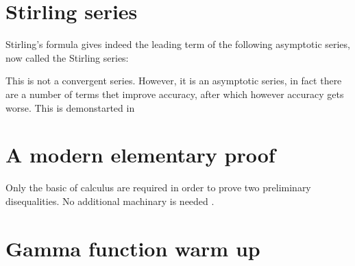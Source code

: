 \documentclass[onecolumn,a4paper,11pt]{article}
\begin{document}
\section{Stirling series}

Stirling's formula gives indeed the leading term of the following asymptotic
series, now called the Stirling series:


This is not a convergent series.
However, it is an asymptotic series, in fact there are a number of terms thet
improve accuracy, after which however accuracy gets worse. This is demonstarted
in

\section{A modern elementary proof\label{sec:Michael}}
Only 
the basic of calculus are required 
in order to prove two  preliminary  disequalities. No additional machinary is
needed%
\autocite[The original paper is][]{Michael:2002}.

\appendix
\section{Gamma function warm up}
\label{sec:Gamma}

\end{document}
